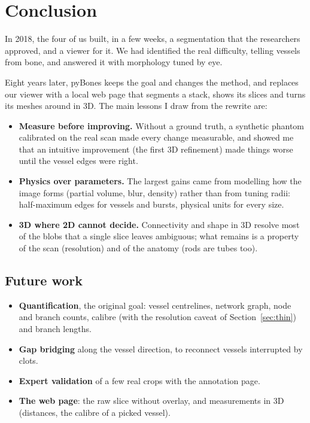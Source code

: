 \chapter{Conclusion}
\label{chap:conclusion}

In 2018, the four of us built, in a few weeks, a segmentation that the researchers approved, and a
viewer for it. We had identified the real difficulty, telling vessels from bone, and answered it with
morphology tuned by eye.

Eight years later, pyBones keeps the goal and changes the method, and replaces our viewer with a local
web page that segments a stack, shows its slices and turns its meshes around in 3D. The main lessons I
draw from the rewrite are:
\begin{itemize}
  \item \textbf{Measure before improving.} Without a ground truth, a synthetic phantom calibrated on the
        real scan made every change measurable, and showed me that an intuitive improvement (the first 3D
        refinement) made things worse until the vessel edges were right.
  \item \textbf{Physics over parameters.} The largest gains came from modelling how the image forms
        (partial volume, blur, density) rather than from tuning radii: half-maximum edges for vessels
        and bursts, physical units for every size.
  \item \textbf{3D where 2D cannot decide.} Connectivity and shape in 3D resolve most of the blobs that a
        single slice leaves ambiguous; what remains is a property of the scan (resolution) and of the
        anatomy (rods are tubes too).
\end{itemize}

\section*{Future work}

\begin{itemize}
  \item \textbf{Quantification}, the original goal: vessel centrelines, network graph, node and branch
        counts, calibre (with the resolution caveat of Section~\ref{sec:thin}) and branch lengths.
  \item \textbf{Gap bridging} along the vessel direction, to reconnect vessels interrupted by clots.
  \item \textbf{Expert validation} of a few real crops with the annotation page.
  \item \textbf{The web page}: the raw slice without overlay, and measurements in 3D (distances, the
        calibre of a picked vessel).
\end{itemize}
